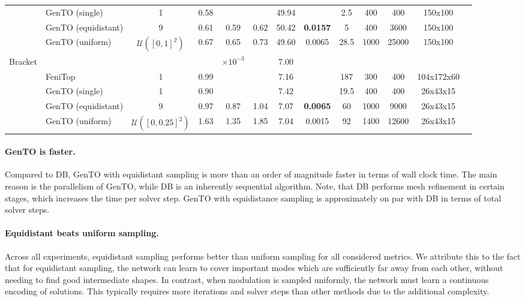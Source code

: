 \begin{table*}[!ht]
{\begin{tabular}{llccccccccccc}
        ~ & GenTO (single) & 1 & 0.58 & ~ & ~ & 49.94 & ~ & 2.5& 400 & 400 & 150x100 \\ 
        ~ & GenTO (equidistant) & 9 & 0.61 & 0.59 & 0.62 & 50.42 & \textbf{0.0157} & 5& 400 & 3600 & 150x100 \\ 
        ~ & GenTO (uniform) & $\mathcal{U}([0,1]^2)$ & 0.67 & 0.65 & 0.73 & 49.60 & 0.0065 & 28.5& 1000 & 25000 & 150x100 \\ 
        \hline 
        Bracket & ~ & ~ & ~ & $\times 10^{-3}$ & ~ & 7.00 & ~ & ~ & ~ & ~ & ~ \\ 
        ~ & FeniTop & 1 & 0.99 & ~ & ~ & 7.16 & ~ & 187& 300 & 400 & 104x172x60 \\ 
        ~ & GenTO (single) & 1 & 0.90 & ~ & ~ & 7.42 & ~ & 19.5& 400 & 400 & 26x43x15 \\ 
        ~ & GenTO (equidistant) & 9 & 0.97 & 0.87 & 1.04 & 7.07 & \textbf{0.0065} & 60& 1000 & 9000 & 26x43x15 \\ 
        ~ & GenTO (uniform) & $\mathcal{U}([0,0.25]^2)$ & 1.63 & 1.35 & 1.85 & 7.04 & 0.0015 & 92& 1400 & 12600 & 26x43x15 \\ 
    \end{tabular}
    \label{tab:results}
    }
\end{table*}

\paragraph{GenTO is faster.}
Compared to DB, GenTO with equidistant sampling is more than an order of magnitude faster in terms of wall clock time.
The main reason is the parallelism of GenTO, while DB is an inherently sequential algorithm.
Note, that DB performs mesh refinement in certain stages, which increases the time per solver step.
GenTO with equidistance sampling is approximately on par with DB in terms of total solver steps.


\paragraph{Equidistant beats uniform sampling.} 
Across all experiments, equidistant sampling performs better than uniform sampling for all considered metrics.
We attribute this to the fact that for equidistant sampling, the network can learn to cover important modes which are sufficiently far away from each other, without needing to find good intermediate shapes.
In contrast, when modulation is sampled uniformly, the network must learn a continuous encoding of solutions. This typically requires more iterations and solver steps than other methods due to the additional complexity.

